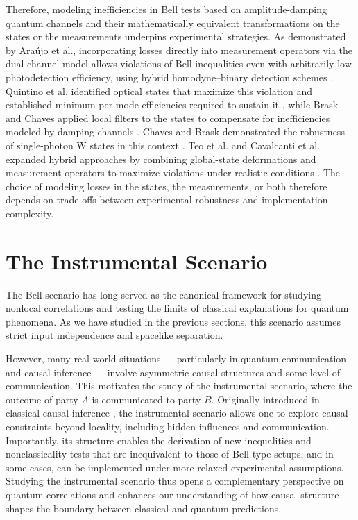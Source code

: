\documentclass[aps,pra,reprint, superscriptaddress,showkeys]{revtex4-2}
\theoremstyle{plain}
\begin{document}
Therefore, modeling inefficiencies in Bell tests based on amplitude-damping quantum channels and their mathematically equivalent transformations on the states or the measurements underpins experimental strategies. As demonstrated by Araújo et al., incorporating losses directly into measurement operators via the dual channel model allows violations of Bell inequalities even with arbitrarily low photodetection efficiency, using hybrid homodyne–binary detection schemes \cite{araujo2012}. Quintino et al. identified optical states that maximize this violation and established minimum per-mode efficiencies required to sustain it \cite{Quintino_2012}, while Brask and Chaves applied local filters to the states to compensate for inefficiencies modeled by damping channels \cite{Brask_e_Chaves}. Chaves and Brask demonstrated the robustness of single-photon W states in this context \cite{Chaves_Brask_2011}. Teo et al. and Cavalcanti et al. expanded hybrid approaches by combining global-state deformations and measurement operators to maximize violations under realistic conditions \cite{cavalcanti2011,Teo2013}. The choice of modeling losses in the states, the measurements, or both therefore depends on trade-offs between experimental robustness and implementation complexity.

 


\section{The Instrumental Scenario}
\label{sec:The Instrumental Scenario}

The Bell scenario has long served as the canonical framework for studying nonlocal correlations and testing the limits of classical explanations for quantum phenomena. As we have studied in the previous sections, this scenario assumes strict input independence and spacelike separation. 

However,  many real-world situations — particularly in quantum communication and causal inference — involve asymmetric causal structures and some level of communication. This motivates the study of the instrumental scenario, where the outcome of party $A$ is communicated to party $B$. Originally introduced in classical causal inference \cite{Pearl2009causality}, the instrumental scenario allows one to explore causal constraints beyond locality, including hidden influences and communication. Importantly, its structure enables the derivation of new inequalities and nonclassicality tests that are inequivalent to those of Bell-type setups, and in some cases, can be implemented under more relaxed experimental assumptions. Studying the instrumental scenario thus opens a complementary perspective on quantum correlations and enhances our understanding of how causal structure shapes the boundary between classical and quantum predictions. 
\end{document}
